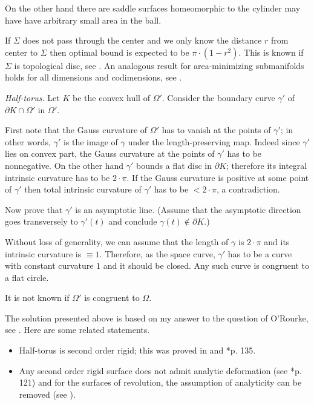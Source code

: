 On the other hand there are saddle surfaces homeomorphic to the cylinder
may have have arbitrary small area in the ball. 

If $\Sigma$ does not pass through the center and we only know the distance $r$ from center to $\Sigma$ then optimal bound is expected to be $\pi\cdot(1-r^2)$.
This is known if $\Sigma$ is topological disc, see \cite{alexander-osserman}.
An analogous result for area-minimizing submanifolds holds for all dimensions and codimensions, see \cite{alexander-hoffman-osserman}.






\textit{Half-torus.}
Let $K$ be the convex hull of $\Omega'$.
Consider the boundary curve $\gamma'$ of $\partial K\cap \Omega'$ in $\Omega'$.

First note that the Gauss curvature of $\Omega'$ has to vanish at the points of $\gamma'$;
in other words, $\gamma'$ is the image of $\gamma$ under the length-preserving map.
Indeed since $\gamma'$ lies on convex part, 
the Gauss curvature at the points of $\gamma'$ has to be nonnegative. 
On the other hand $\gamma'$ bounds a flat disc in $\partial K$;
therefore its integral intrinsic curvature has to be $2{\cdot}\pi$.
If the Gauss curvature is positive at some point of $\gamma'$ then total intrinsic curvature of $\gamma'$ has to be $<2{\cdot}\pi$, a contradiction.

Now prove that $\gamma'$ is an asymptotic line.
(Assume that the asymptotic direction goes transversely to $\gamma'(t)$ and conclude $\gamma(t)\notin\partial K$.)

Without loss of generality, we can assume that the length of $\gamma$ is $2{\cdot}\pi$ and its intrinsic curvature is $\equiv 1$.
Therefore, as the space curve,
$\gamma'$ has to be a curve with constant curvature $1$ and it should be closed.
Any such curve is congruent to a flat circle.

 It is not known if $\Omega'$ is congruent to $\Omega$.

The solution presented above is based on my answer 
to the question of O'Rourke, see \cite{rourke}.
Here are some related statements.
\begin{itemize}
\item Half-torus is second order rigid;
this was proved in
\cite{rembs} 
and \cite{efimov}*{p. 135}.
\item Any second order rigid surface does not admit analytic deformation (see \cite{efimov}*{p. 121})
and for the surfaces of revolution, the assumption of analyticity can be removed (see \cite{sabitov}).
\end{itemize}






